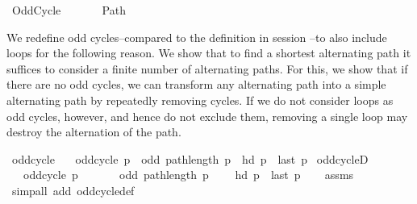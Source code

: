 %
\begin{isabellebody}%
%
%
\isadelimtheory
%
\endisadelimtheory
%
\isatagtheory
{}\isamarkupfalse%
\ Odd{\isacharunderscore}{\kern0pt}Cycle\isanewline
\ \ \isanewline
\ \ \ \ Path\isanewline
{}%
\endisatagtheory
{\isafoldtheory}%
%
\isadelimtheory
%
\endisadelimtheory
%
\begin{isamarkuptext}%
We redefine odd cycles--compared to the definition in session --to also include loops
for the following reason. We show that to find a shortest alternating path it suffices to consider a
finite number of alternating paths. For this, we show that if there are no odd cycles, we can
transform any alternating path into a simple alternating path by repeatedly removing cycles. If we
do not consider loops as odd cycles, however, and hence do not exclude them, removing a single loop
may destroy the alternation of the path.%
\end{isamarkuptext}\isamarkuptrue%
\isamarkupfalse%
\ odd{\isacharunderscore}{\kern0pt}cycle\ \isanewline
\ \ {\isachardoublequoteopen}odd{\isacharunderscore}{\kern0pt}cycle\ p\ {\isasymequiv}\ odd\ {\isacharparenleft}{\kern0pt}path{\isacharunderscore}{\kern0pt}length\ p{\isacharparenright}{\kern0pt}\ {\isasymand}\ hd\ p\ {\isacharequal}{\kern0pt}\ last\ p{\isachardoublequoteclose}\isanewline
%
\isadeliminvisible
\isanewline
%
\endisadeliminvisible
%
\isataginvisible
{}\isamarkupfalse%
\ odd{\isacharunderscore}{\kern0pt}cycleD{\isacharcolon}{\kern0pt}\isanewline
\ \ \ {\isachardoublequoteopen}odd{\isacharunderscore}{\kern0pt}cycle\ p{\isachardoublequoteclose}\isanewline
\ \ \isanewline
\ \ \ \ {\isachardoublequoteopen}odd\ {\isacharparenleft}{\kern0pt}path{\isacharunderscore}{\kern0pt}length\ p{\isacharparenright}{\kern0pt}{\isachardoublequoteclose}\isanewline
\ \ \ \ {\isachardoublequoteopen}hd\ p\ {\isacharequal}{\kern0pt}\ last\ p{\isachardoublequoteclose}%
\endisataginvisible
{\isafoldinvisible}%
%
\isadeliminvisible
\isanewline
%
\endisadeliminvisible
%
\isadelimproof
\ \ %
\endisadelimproof
%
\isatagproof
{}\isamarkupfalse%
\ assms\isanewline
\ \ \isamarkupfalse%
\ {\isacharparenleft}{\kern0pt}simp{\isacharunderscore}{\kern0pt}all\ add{\isacharcolon}{\kern0pt}\ odd{\isacharunderscore}{\kern0pt}cycle{\isacharunderscore}{\kern0pt}def{\isacharparenright}{\kern0pt}%

\end{isabellebody}
